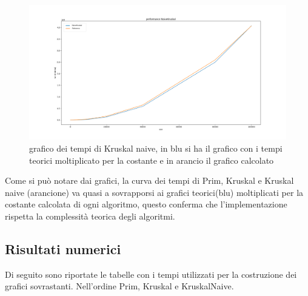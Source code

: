 \begin{figure}[htbp]
    \centering
    \centerline{\includegraphics[scale = 0.38]{Fig/NaiveKruskalFinale.png}}
    \caption{grafico dei tempi di Kruskal naive, in blu si ha il grafico con i tempi teorici moltiplicato per la costante e in arancio il grafico calcolato}
    \label{Kruskal naive}
\end{figure}


Come si può notare dai grafici, la curva dei tempi di Prim, Kruskal e Kruskal naive (arancione) va quasi a sovrapporsi ai grafici teorici(blu) moltiplicati per la costante calcolata di ogni algoritmo, questo conferma che l'implementazione rispetta la complessità teorica degli algoritmi.

\newpage
\subsection{Risultati numerici}

Di seguito sono riportate le tabelle con i tempi utilizzati per la costruzione dei grafici sovrastanti. Nell'ordine Prim, Kruskal e KruskalNaive.

